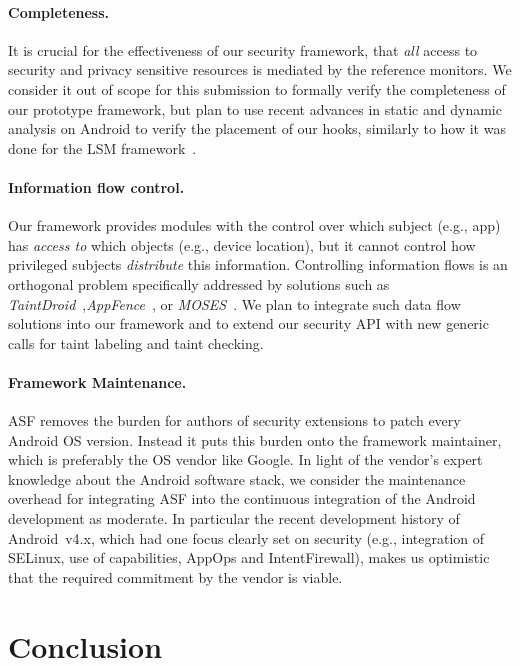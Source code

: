 \documentclass[letterpaper,twocolumn,10pt]{article}
\newcommand{\OURSHORT}{\textsc{ASF}\xspace}
\begin{document}
\paragraph{Completeness.}
It is crucial for the effectiveness of our security framework, that \textit{all} access to security and privacy sensitive resources is mediated by the reference monitors. We consider it out of scope for this submission to formally verify the completeness of our prototype framework, but plan to use recent advances in static and dynamic analysis on Android to verify the placement of our hooks, similarly to how it was done for the LSM framework~\cite{edwards:ccs02,ganapathy:ccs05}.

\paragraph{Information flow control.}
Our framework provides modules with the control over which subject (e.g., app) has \textit{access to} which objects (e.g., device location), but it cannot control how privileged subjects \textit{distribute} this information. Controlling information flows is an orthogonal problem specifically addressed by solutions such as \textit{TaintDroid}~\cite{EnGiBy_10:Taindroid},\textit{AppFence}~\cite{HoHaJuScWe_11:RetrofittingAndroid}, or \textit{MOSES}~\cite{Russello:2012:MSO:2295136.2295140}. We plan to integrate such data flow solutions into our framework and to extend our security API with new generic calls for taint labeling and taint checking.

\paragraph{Framework Maintenance.}
\OURSHORT removes the burden for authors of security extensions to patch every Android OS version. Instead it puts this burden onto the framework maintainer, which is preferably the OS vendor like Google. In light of the vendor's expert knowledge about the Android software stack, we consider the maintenance overhead for integrating \OURSHORT into the continuous integration of the Android development as moderate. In particular the recent development history of Android~v4.x, which had one focus clearly set on security (e.g., integration of SELinux, use of capabilities, AppOps and IntentFirewall), makes us optimistic that the required commitment by the vendor is viable.
 
\section{Conclusion}
\label{conclusion}
\end{document}
